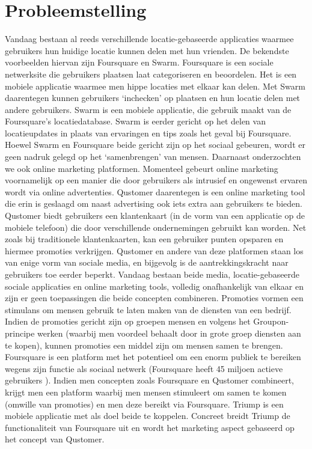 \chapter{Probleemstelling}
Vandaag bestaan al reeds verschillende locatie-gebaseerde applicaties waarmee gebruikers hun huidige locatie kunnen delen met hun vrienden. De bekendste voorbeelden hiervan zijn Foursquare\cite{foursquare} en Swarm\cite{swarm}. Foursquare is een sociale netwerksite die gebruikers plaatsen laat categoriseren en beoordelen. Het is een mobiele applicatie waarmee men hippe locaties met elkaar kan delen. Met Swarm daarentegen kunnen gebruikers `inchecken' op plaatsen en hun locatie delen met andere gebruikers. Swarm is een mobiele applicatie, die gebruik maakt van de Foursquare's locatiedatabase. Swarm is eerder gericht op het delen van locatieupdates in plaats van ervaringen en tips zoals het geval bij Foursquare.
Hoewel Swarm en Foursquare beide gericht zijn op het sociaal gebeuren, wordt er geen nadruk gelegd op het `samenbrengen' van mensen. 
Daarnaast onderzochten we ook online marketing platformen. Momenteel gebeurt online marketing voornamelijk op een manier die door gebruikers als intrusief en ongewenst ervaren wordt via online advertenties. Qustomer\cite{qustomer} daarentegen is een online marketing tool die erin is geslaagd om naast advertising ook iets extra aan gebruikers te bieden. Qustomer biedt gebruikers een klantenkaart (in de vorm van een applicatie op de mobiele telefoon) die door verschillende ondernemingen gebruikt kan worden. Net zoals bij traditionele klantenkaarten, kan een gebruiker punten opsparen en hiermee promoties verkrijgen. Qustomer en andere van deze platformen staan los van enige vorm van sociale media, en bijgevolg is de aantrekkingskracht naar gebruikers toe eerder beperkt.
Vandaag bestaan beide media, locatie-gebaseerde sociale applicaties en online marketing tools, volledig onafhankelijk van elkaar en zijn er geen toepassingen die beide concepten combineren. 
Promoties vormen een stimulans om mensen gebruik te laten maken van de diensten van een bedrijf. Indien de promoties gericht zijn op groepen mensen en volgens het Groupon-principe werken (waarbij men voordeel behaalt door in grote groep diensten aan te kopen), kunnen promoties een middel zijn om mensen samen te brengen.
Foursquare is een platform met het potentieel om een enorm publiek te bereiken wegens zijn functie als sociaal netwerk (Foursquare heeft 45 miljoen actieve gebruikers \cite{users}).
Indien men concepten zoals Foursquare en Qustomer combineert, krijgt men een platform waarbij men mensen stimuleert om samen te komen (omwille van promoties) en men deze bereikt via Foursquare.
Triump is een mobiele applicatie met als doel beide te koppelen.
Concreet breidt Triump de functionaliteit van Foursquare uit en wordt het marketing aspect gebaseerd op het concept van Qustomer. 



